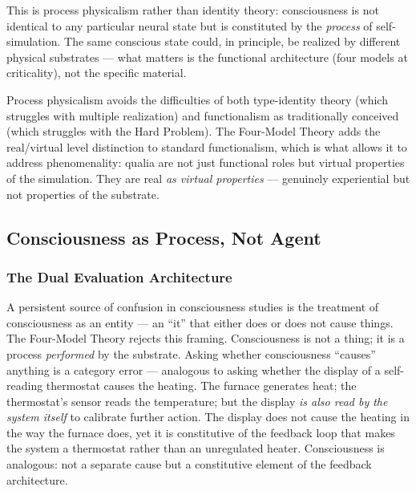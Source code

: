 \documentclass[12pt]{article}
\newcommand{\revstart}{}
\newcommand{\revend}{}
\begin{document}
This is process physicalism rather than identity theory: consciousness is not identical to any particular neural state but is constituted by the \emph{process} of self-simulation. The same conscious state could, in principle, be realized by different physical substrates --- what matters is the functional architecture (four models at criticality), not the specific material.

Process physicalism avoids the difficulties of both type-identity theory (which struggles with multiple realization) and functionalism as traditionally conceived (which struggles with the Hard Problem). The Four-Model Theory adds the real/virtual level distinction to standard functionalism, which is what allows it to address phenomenality: qualia are not just functional roles but virtual properties of the simulation. They are real \emph{as virtual properties} --- genuinely experiential but not properties of the substrate.


\subsection{Consciousness as Process, Not Agent}



\subsubsection{The Dual Evaluation Architecture}


A persistent source of confusion in consciousness studies is the treatment of consciousness as an entity --- an ``it'' that either does or does not cause things. The Four-Model Theory rejects this framing. Consciousness is not a thing; it is a process \emph{performed} by the substrate. Asking whether consciousness ``causes'' anything is a category error --- {\revstart analogous to asking whether the display of a self-reading thermostat causes the heating. The furnace generates heat; the thermostat's sensor reads the temperature; but the display \emph{is also read by the system itself} to calibrate further action. The display does not cause the heating in the way the furnace does, yet it is constitutive of the feedback loop that makes the system a thermostat rather than an unregulated heater. Consciousness is analogous: not a separate cause but a constitutive element of the feedback architecture.\revend}
\end{document}
